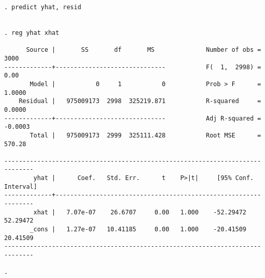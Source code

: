 \documentclass[letterpaper,12pt,titlepage,oneside,final]{book}
\begin{document}
\begin{verbatim}
. predict yhat, resid

 
. reg yhat xhat

      Source |       SS       df       MS              Number of obs =    3000
-------------+------------------------------           F(  1,  2998) =    0.00
       Model |           0     1           0           Prob > F      =  1.0000
    Residual |   975009173  2998  325219.871           R-squared     =  0.0000
-------------+------------------------------           Adj R-squared = -0.0003
       Total |   975009173  2999  325111.428           Root MSE      =  570.28

------------------------------------------------------------------------------
        yhat |      Coef.   Std. Err.      t    P>|t|     [95% Conf. Interval]
-------------+----------------------------------------------------------------
        xhat |   7.07e-07    26.6707     0.00   1.000    -52.29472    52.29472
       _cons |   1.27e-07   10.41185     0.00   1.000    -20.41509    20.41509
------------------------------------------------------------------------------

. 


\end{verbatim}
\end{document}
